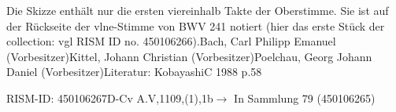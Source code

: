 \documentclass[a4paper, twocolumn, 11pt]{book}
\begin{document}
\newline %
\par Die Skizze enthält nur die ersten viereinhalb Takte der Oberstimme. Sie ist auf der Rückseite der vlne-Stimme von BWV 241 notiert (hier das erste Stück der {\textquotedbl}collection{\textquotedbl}: vgl RISM ID no. 450106266).\newline Bach, Carl Philipp Emanuel  (Vorbesitzer)\newline Kittel, Johann Christian  (Vorbesitzer)\newline Poelchau, Georg Johann Daniel  (Vorbesitzer)\newline Literatur: KobayashiC 1988  p.58
\par RISM-ID: 450106267\newline D-Cv  A.V,1109,(1),1b\newline $\rightarrow$ In Sammlung 79 (450106265)
      
\end{document}
